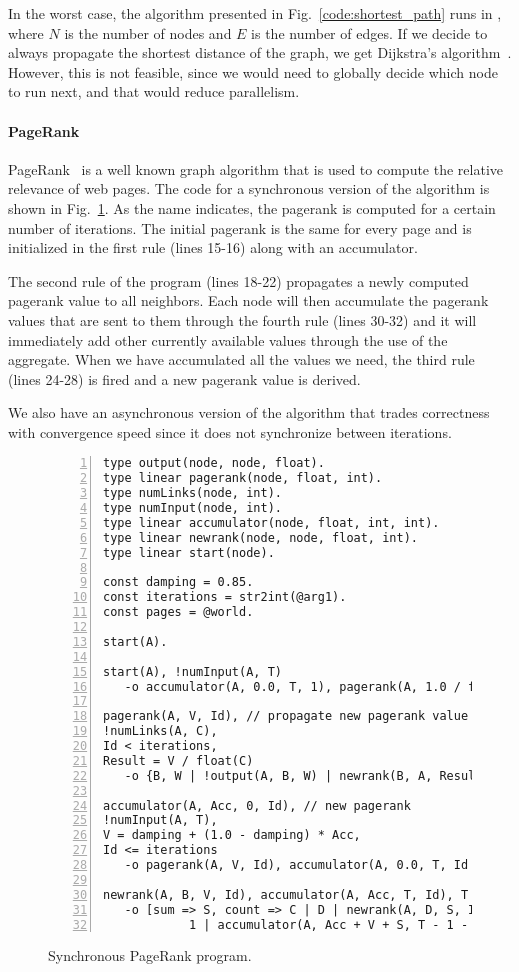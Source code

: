 In the worst case, the algorithm presented in Fig.~\ref{code:shortest_path} runs in , where $N$ is the number of nodes and $E$ is the
number of edges. If we decide to always propagate the shortest distance of the graph, we get Dijkstra's algorithm~\cite{Dijkstra}. However, this is
not feasible, since we would need to globally decide which node to run next, and that would reduce parallelism.

\paragraph{PageRank}

PageRank~\cite{Page:2001:MNR} is a well known graph algorithm that is used to compute the relative relevance of web pages.
The code for a synchronous version of the algorithm is shown in Fig.~\ref{code:pagerank}.
As the name indicates, the pagerank is computed for a certain number of iterations. The initial pagerank is the same for every page and is
initialized in the first rule (lines 15-16) along with an accumulator.

The second rule of the program (lines 18-22) propagates a newly computed pagerank value to all neighbors. Each node will then accumulate
the pagerank values that are sent to them through the fourth rule (lines 30-32) and it will immediately add other currently available values
through the use of the aggregate. When we have accumulated all the values we need, the third rule (lines 24-28) is fired and a new pagerank value is derived.

We also have an asynchronous version of the algorithm that trades correctness with convergence speed since it does not synchronize between iterations.

\begin{figure}[h!]
   \footnotesize\begin{Verbatim}[numbers=left]
type output(node, node, float).
type linear pagerank(node, float, int).
type numLinks(node, int).
type numInput(node, int).
type linear accumulator(node, float, int, int).
type linear newrank(node, node, float, int).
type linear start(node).

const damping = 0.85.
const iterations = str2int(@arg1).
const pages = @world.

start(A).

start(A), !numInput(A, T)
   -o accumulator(A, 0.0, T, 1), pagerank(A, 1.0 / float(pages), 0).

pagerank(A, V, Id), // propagate new pagerank value
!numLinks(A, C),
Id < iterations,
Result = V / float(C)
   -o {B, W | !output(A, B, W) | newrank(B, A, Result, Id + 1)}.

accumulator(A, Acc, 0, Id), // new pagerank
!numInput(A, T),
V = damping + (1.0 - damping) * Acc,
Id <= iterations
   -o pagerank(A, V, Id), accumulator(A, 0.0, T, Id + 1).
	
newrank(A, B, V, Id), accumulator(A, Acc, T, Id), T > 0
   -o [sum => S, count => C | D | newrank(A, D, S, Id) |
            1 | accumulator(A, Acc + V + S, T - 1 - C, Id)].
\end{Verbatim}
\caption{Synchronous PageRank program.}
\label{code:pagerank}
\normalsize
\end{figure}

